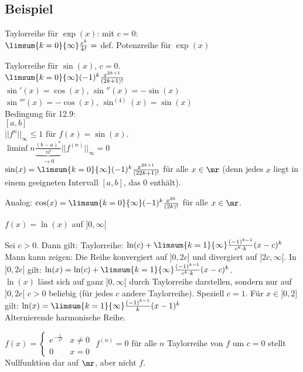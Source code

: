 \subsection{Beispiel}
	\item  Taylorreihe für $ \exp(x) $: mit $ c=0 $:\\
	$ \limsum{k=0}{\infty}\frac{x^k}{k!}= $ def. Potenzreihe für $ \exp(x) $
	\item  Taylorreihe für $ \sin(x) $, $ c=0 $.\\
	$ \limsum{k=0}{\infty}(-1)^k\frac{x^{2k+1}}{(2k+1)!} $\\
	$ \sin'(x)=\cos(x) $, $ \sin''(x)=-\sin(x) $\\
	$ \sin'''(x)=-\cos(x) $, $ \sin^{(4)}(x)=\sin(x) $\\
	Bedingung für 12.9:\\
	$ [a,b] $\\
	$ ||f^n||_\infty\leq 1 $ für $ f(x)=\sin(x) $.\\
	$ \liminf{n}\underbrace{\frac{(b-a)^n}{n!}}_{\rightarrow 0}||f^{(n)}||_\infty=0 $\\
	$ \sin(x)=\limsum{k=0}{\infty}(-1)^k\frac{x^{2k+1}}{(22k+1)!} $ für alle $ x\in\mr $ (denn jedes $ x $ liegt in einem geeigneten Intervall $ [a,b] $, das 0 enthält).
	\item Analog: $ \cos(x)=\limsum{k=0}{\infty}(-1)^k\frac{x^{2k}}{(2k)!} $ für alle $ x\in\mr $.
	\item $ f(x)=\ln(x) $ auf $ ]0,\infty[ $
	
	Sei $ c>0 $. Dann gilt:
	Taylorreihe: $ \ln(c)+\limsum{k=1}{\infty}\frac{(-1)^{k-1}}{c^k\cdot k}(x-c)^k $\\
	Mann kann zeigen: Die Reihe konvergiert auf $ ]0,2c] $ und divergiert auf $ ]2c,\infty[ $. In $ ]0,2c[ $ gilt: $ \ln(x)=\ln(c)+\limsum{k=1}{\infty}\frac{(-1)^{k-1}}{c^k\cdot k}(x-c)^k $.\\
	$ \ln(x) $ lässt sich auf ganz $ ]0,\infty[ $ durch Taylorreihe darstellen, sondern nur auf $ ]0,2c[ $ $ c>0 $ beliebig (für jedes $ c $ andere Taylorreihe). Speziell $ c=1 $. Für $ x\in]0,2] $ gilt: $ \ln(x)=\limsum{k=1}{\infty}\frac{(-1)^{k-1}}{k}(x-1)^k $\\
	Alternierende harmonische Reihe.
	\item  $ f(x)=\begin{cases}e^{-\frac{1}{x^2}}&x\neq 0\\0&x=0\end{cases} $
	$ f^{(n)}=0 $ für alle $ n $ Taylorreihe von $ f $ um $ c=0 $ stellt Nullfunktion dar auf $ \mr $, aber nicht $ f $.
	\subExEnd
